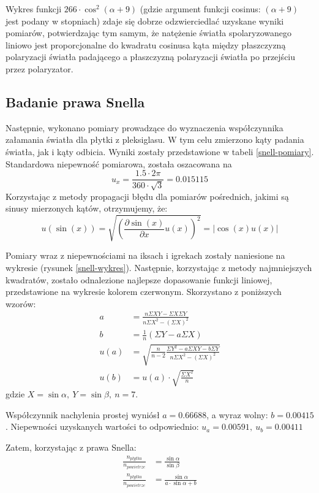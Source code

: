 \documentclass[a4paper]{article}
\newlength{\du}
\begin{document}
Wykres funkcji $266 \cdot \cos^2(\alpha + 9)$ (gdzie argument funkcji cosinus: $(\alpha + 9)$ jest podany w stopniach) zdaje się dobrze odzwierciedlać uzyskane wyniki pomiarów, potwierdzając tym samym, że natężenie światła spolaryzowanego liniowo jest proporcjonalne do kwadratu cosinusa kąta między płaszczyzną polaryzacji światła padającego a płaszczyzną polaryzacji światła po przejściu przez polaryzator.


\subsection{Badanie prawa Snella}
Następnie, wykonano pomiary prowadzące do wyznaczenia współczynnika załamania światła dla płytki z pleksiglasu.
W tym celu zmierzono kąty padania światła, jak i kąty odbicia.
Wyniki zostały przedstawione w tabeli \ref{snell-pomiary}.
Standardowa niepewność pomiarowa, została oszacowana na
\[
	u_x = \frac{1.5 \cdot 2 \pi}{360 \cdot \sqrt{3}} = 0.015115
\]
Korzystając z metody propagacji błędu dla pomiarów pośrednich, jakimi są sinusy mierzonych kątów, otrzymujemy, że:
\[
	u(\sin(x)) = \sqrt{\left(\frac{\partial \sin(x)}{\partial x}u(x)\right)^2} = \left|\cos(x)u(x)\right|
\]

Pomiary wraz z niepewnościami na iksach i igrekach zostały naniesione na wykresie (rysunek \ref{snell-wykres}).
Następnie, korzystając z metody najmniejszych kwadratów, zostało odnalezione najlepsze dopasowanie funkcji liniowej, przedstawione na wykresie kolorem czerwonym.
Skorzystano z poniższych wzorów:
\begin{align*}
a &= \frac{n \Sigma X Y - \Sigma X \Sigma Y}{n \Sigma X^2 - \left(\Sigma X\right)^2} \\
b &= \frac{1}{n}\left(\Sigma Y - a \Sigma X\right) \\
u(a) &= \sqrt{\frac{n}{n-2} \frac{\Sigma Y^2 - a\Sigma XY - b\Sigma Y}{n\Sigma X^2-\left(\Sigma X \right)^2}} \\
u(b) &= u(a)\cdot \sqrt{\frac{\Sigma X^2}{n}}
\end{align*}
gdzie $X = \sin\alpha, \ Y = \sin\beta, \ n = 7$.


Współczynnik nachylenia prostej wyniósł $a = 0.66688$, a wyraz wolny: $b = 0.00415$.
Niepewności uzyskanych wartości to odpowiednio:
$ u_a=0.00591, \ u_b=0.00411 $

Zatem, korzystając z prawa Snella:
\begin{align*}
\frac{n_{plytka}}{n_{powietrze}} &= \frac{\sin\alpha}{\sin\beta} \\ 
\frac{n_{plytka}}{n_{powietrze}} &= \frac{\sin\alpha}{a \cdot \sin\alpha + b}
\end{align*}
\end{document}
